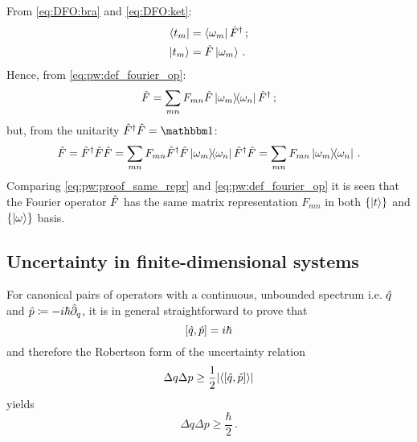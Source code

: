

From \eqref{eq:DFO:bra} and \eqref{eq:DFO:ket}:
\begin{align}
  \bra{t_m} &= \bra{\omega_m}\hat{F}^{\dagger} \, \text{;} \\
  \ket{t_m} &= \hat{F} \ket{\omega_m} \, \text{.} 
\end{align}
Hence, from \eqref{eq:pw:def_fourier_op}:
\begin{equation}
  \hat{F} = \sum_{mn} F_{mn} \hat{F} \ketbra{\omega_m}{\omega_n} \hat{F}^{\dagger} \, \text{;}
\end{equation}
but, from the unitarity $\op{F}^{\dagger}\op{F} = \idop$:
\begin{equation}\label{eq:pw:proof_same_repr}
  \hat{F} = \hat{F}^{\dagger}\hat{F}\hat{F} = \sum_{mn} F_{mn} \hat{F}^{\dagger}\hat{F} \ketbra{\omega_m}{\omega_n} \hat{F}^{\dagger}\hat{F}
  = \sum_{mn} F_{mn} \ketbra{\omega_m}{\omega_n} \, \text{.}
\end{equation}
Comparing \eqref{eq:pw:proof_same_repr} and \eqref{eq:pw:def_fourier_op}
it is seen that the Fourier operator $\hat{F}$
has the same matrix representation $F_{mn}$
in both $\left\{\ket{t}\right\}$ and $\left\{\ket{\omega}\right\}$ basis. 

\subsection{Uncertainty in finite-dimensional systems}\label{sec:finite_uncertainty}
\citereset
For canonical pairs of operators with a continuous, unbounded spectrum i.e.
$\hat{q}$ and $\hat{p} \coloneqq -i\hbar\hat{\partial}_{q}$,
it is in general straightforward to prove that
\begin{equation}\label{eq:commconstant}
  \qty[\hat{q}, \hat{p}] = i\hbar
\end{equation}
and therefore
the Robertson form of the uncertainty relation
\begin{equation}\label{eq:robertsonconstant}
  \Delta q \Delta p \geq { \frac{1}{2} \qty|\ev{\qty[\op{q}, \op{p}]}| }
\end{equation}
yields
\begin{equation}\label{eq:min_uncertain_constant}
  \Delta q \Delta p \geq { \frac{\hbar}{2} } \, \text{.}
\end{equation}

